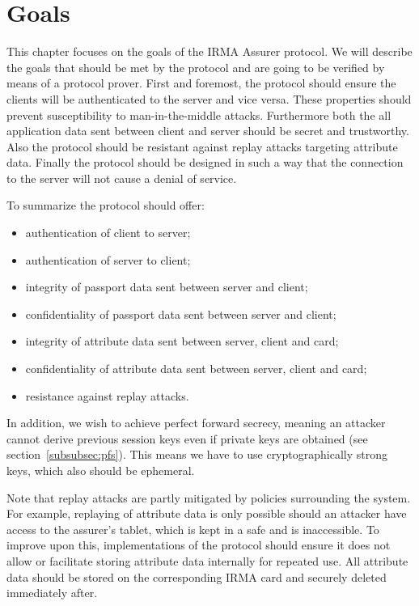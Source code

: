 \chapter{Goals}
\label{sec:goals}
This chapter focuses on the goals of the IRMA Assurer protocol. We will describe the goals that should be met by the protocol and are going to be verified by means of a protocol prover. First and foremost, the protocol should ensure the clients will be authenticated to the server and vice versa. These properties should prevent susceptibility to man-in-the-middle attacks. Furthermore both the all application data sent between client and server should be secret and trustworthy. Also the protocol should be resistant against replay attacks targeting attribute data. Finally the protocol should be designed in such a way that the connection to the server will not cause a denial of service.

To summarize the protocol should offer:
\begin{itemize}
  \item authentication of client to server;
  \item authentication of server to client;
  \item integrity of passport data sent between server and client;
  \item confidentiality of passport data sent between server and client;
  \item integrity of attribute data sent between server, client and card;
  \item confidentiality of attribute data sent between server, client and card;
  \item resistance against replay attacks.
\end{itemize}

In addition, we wish to achieve perfect forward secrecy, meaning an attacker cannot derive previous session keys even if private keys are obtained (see section~\ref{subsubsec:pfs}). This means we have to use cryptographically strong keys, which also should be ephemeral.

Note that replay attacks are partly mitigated by policies surrounding the system. For example, replaying of attribute data is only possible should an attacker have access to the assurer's tablet, which is kept in a safe and is inaccessible. To improve upon this, implementations of the protocol should ensure it does not allow or facilitate storing attribute data internally for repeated use. All attribute data should be stored on the corresponding IRMA card and securely deleted immediately after.

